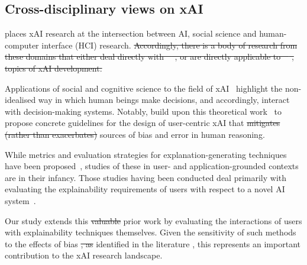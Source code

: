 \documentclass[final,5p,times,twocolumn,hyphens]{elsarticle}
\providecommand{\DIFaddtex}[1]{{\protect\color{blue}\uwave{#1}}} %
\providecommand{\DIFdeltex}[1]{{\protect\color{red}\sout{#1}}}                      %
\providecommand{\DIFaddbegin}{} %
\providecommand{\DIFaddend}{} %
\providecommand{\DIFdelbegin}{} %
\providecommand{\DIFdelend}{} %
\providecommand{\DIFadd}[1]{\texorpdfstring{\DIFaddtex{#1}}{#1}} %
\providecommand{\DIFdel}[1]{\texorpdfstring{\DIFdeltex{#1}}{}} %
\newcommand{\DIFscaledelfig}{0.5}
\newlength{\DIFdelgraphicswidth} %
\newlength{\DIFdelgraphicsheight} %
\newcommand{\DIFaddincludegraphics}[2][]{{\color{blue}\fbox{\DIFOincludegraphics[#1]{#2}}}} %
\newcommand{\DIFdelincludegraphics}[2][]{%
\sbox{\DIFdelgraphicsbox}{\DIFOincludegraphics[#1]{#2}}%
\settoboxwidth{\DIFdelgraphicswidth}{\DIFdelgraphicsbox} %
\settoboxtotalheight{\DIFdelgraphicsheight}{\DIFdelgraphicsbox} %
\scalebox{\DIFscaledelfig}{%
\parbox[b]{\DIFdelgraphicswidth}{\usebox{\DIFdelgraphicsbox}\\[-\baselineskip] \rule{\DIFdelgraphicswidth}{0em}}\llap{\resizebox{\DIFdelgraphicswidth}{\DIFdelgraphicsheight}{%
\setlength{\unitlength}{\DIFdelgraphicswidth}%
\begin{picture}(1,1)%
\thicklines\linethickness{2pt} %
{\color[rgb]{1,0,0}\put(0,0){\framebox(1,1){}}}%
{\color[rgb]{1,0,0}\put(0,0){\line( 1,1){1}}}%
{\color[rgb]{1,0,0}\put(0,1){\line(1,-1){1}}}%
\end{picture}%
}\hspace*{3pt}}} %
} %
\DeclareRobustCommand{\DIFaddbegin}{\DIFOaddbegin \let\includegraphics\DIFaddincludegraphics} %
\DeclareRobustCommand{\DIFaddend}{\DIFOaddend \let\includegraphics\DIFOincludegraphics} %
\DeclareRobustCommand{\DIFdelbegin}{\DIFOdelbegin \let\includegraphics\DIFdelincludegraphics} %
\DeclareRobustCommand{\DIFdelend}{\DIFOaddend \let\includegraphics\DIFOincludegraphics} %
\begin{document}
\subsection{Cross-disciplinary views on xAI}

\citet{miller2019explanation} places xAI research at the intersection between \DIFaddbegin \DIFadd{ML/}\DIFaddend AI, social science and human-computer interface (HCI) research. \DIFdelbegin \DIFdel{Accordingly, there is a body of research from these domains that either deal directly with~\mbox{%
\cite{abdul2020cogam, holzinger2013human}}\hspace{0pt}%
, or are directly applicable to~\mbox{%
\cite{nielsen2005ten}}\hspace{0pt}%
, topics of xAI development.
}%

\DIFdelend %
Applications of social and cognitive science to the field of xAI~\cite{de2017people, miller2019explanation, lipton2018mythos, jussupow2021augmenting} highlight the non-idealised way in which human beings make decisions, and accordingly, interact with decision-making systems. Notably, \citet{wang_designing_2019} build upon this theoretical work~\cite{hoffman2017explainingpart1,hoffman2017explainingpart2, klein2018explainingpart3, hoffman2018explainingpart4} to propose concrete guidelines for the design of user-centric xAI that \DIFdelbegin \DIFdel{mitigates (rather than exacerbates) }\DIFdelend \DIFaddbegin \DIFadd{aims to mitigate }\DIFaddend sources of bias and error in human reasoning.

While metrics and evaluation strategies for explanation-generating techniques have been proposed~\cite{doshi2017towards, HolzingerEtAl:2019:Wiley-Paper, HolzingerEtAl:2020:QualityOfExplanations}, studies of these in user- and application-grounded contexts are in their infancy. Those studies having been conducted deal primarily with evaluating the explainability requirements of users with respect to a novel AI system~\cite{liao2020questioning, cai2019hello}.

Our study extends this \DIFdelbegin \DIFdel{valuable }\DIFdelend prior work by evaluating the interactions of users with explainability techniques themselves. Given the sensitivity of such methods to the effects of bias \DIFdelbegin \DIFdel{, as }\DIFdelend identified in the literature \DIFaddbegin \DIFadd{cited}\DIFaddend , this represents an important contribution to the xAI research landscape.
\end{document}

